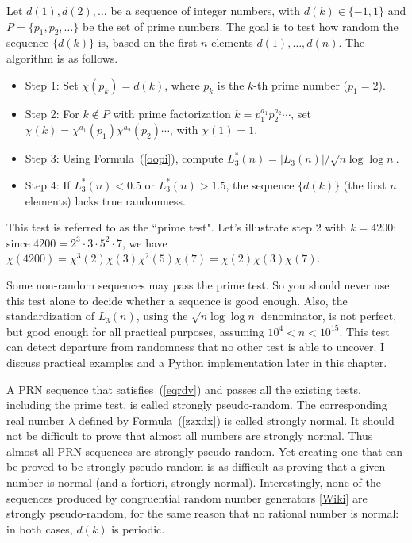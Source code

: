 \documentclass[oneside,10pt]{book}
\begin{document}
Let $d(1),d(2),\dots$ be a sequence of integer numbers, with $d(k)\in \{-1,1\}$ and
$P=\{p_1,p_2,\dots\}$ be the set of prime numbers. The goal is to test how random the sequence $\{d(k)\}$ is, based on the first $n$ elements $d(1),\dots,d(n)$. The algorithm is as follows.
\begin{itemize}
\item Step 1: Set $\chi(p_k)=d(k)$, where $p_k$ is the $k$-th prime number ($p_1=2$). 
\item Step 2: For $k\notin P$ with
 prime factorization $k=p_1^{a_1}p_2^{a_2}\cdots$, set
$\chi(k)=\chi^{a_1}(p_1)\chi^{a_2}(p_2)\cdots$, with $\chi(1)=1.$
\item Step 3: Using Formula~(\ref{oopi}), compute $L^*_3(n) = |L_3(n)|/\sqrt{n\log\log n}$. 
\item Step 4: If $L^*_3(n)<0.5$ or $L^*_3(n)>1.5$, the sequence $\{d(k)\}$ (the first $n$ elements) lacks true randomness.
\end{itemize}
This test is referred to as the ``\textcolor{index}{prime test}".
Let's illustrate step 2 with $k=4200$: since $4200=2^3\cdot 3\cdot 5^2 \cdot 7$, we have $\chi(4200)=\chi^3(2)\chi(3)\chi^2(5)\chi(7)
 = \chi(2)\chi(3)\chi(7)$. 

Some non-random sequences may pass the prime test. So you should never use this test alone to decide whether a sequence is good enough.
 Also, the standardization of $L_3(n)$, using the $\sqrt{n\log\log n}$ denominator, is not perfect, but good enough for all practical purposes, assuming $10^4<n<10^{15}$.  This test can detect departure from randomness that no other test is able to uncover. 
I discuss practical examples and
 a Python implementation later in this chapter.

A PRN sequence that satisfies~(\ref{eqrdv}) and passes all the existing tests, including the prime test, is called \textcolor{index}{strongly pseudo-random}. The
corresponding real number $\lambda$ defined by Formula~(\ref{zzxdx}) is called \textcolor{index}{strongly normal}. It should not be difficult to
prove that almost all numbers are strongly normal. Thus almost all PRN sequences are strongly pseudo-random. Yet creating
one that can be proved to be strongly pseudo-random is as difficult as proving that a given number is normal (and a fortiori, strongly normal). Interestingly, none of the sequences produced by \textcolor{index}{congruential random number generators} 
[\href{https://en.wikipedia.org/wiki/Linear_congruential_generator}{Wiki}] are strongly pseudo-random,
for the same reason that no rational number is normal: in both cases, $d(k)$ is periodic. 
\end{document}

